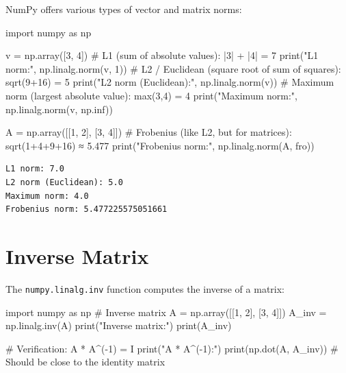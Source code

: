 \documentclass[
  english,
  letterpaper,
  DIV=11,
  numbers=noendperiod]{scrreprt}
\newenvironment{Shaded}{\begin{snugshade}}{\end{snugshade}}
\newcommand{\BuiltInTok}[1]{\textcolor[rgb]{0.00,0.23,0.31}{#1}}
\newcommand{\CommentTok}[1]{\textcolor[rgb]{0.37,0.37,0.37}{#1}}
\newcommand{\DecValTok}[1]{\textcolor[rgb]{0.68,0.00,0.00}{#1}}
\newcommand{\ImportTok}[1]{\textcolor[rgb]{0.00,0.46,0.62}{#1}}
\newcommand{\NormalTok}[1]{\textcolor[rgb]{0.00,0.23,0.31}{#1}}
\newcommand{\OperatorTok}[1]{\textcolor[rgb]{0.37,0.37,0.37}{#1}}
\newcommand{\StringTok}[1]{\textcolor[rgb]{0.13,0.47,0.30}{#1}}
\begin{document}
NumPy offers various types of vector and matrix norms:

\begin{Shaded}
\begin{Highlighting}[]
\ImportTok{import}\NormalTok{ numpy }\ImportTok{as}\NormalTok{ np}

\NormalTok{v }\OperatorTok{=}\NormalTok{ np.array([}\DecValTok{3}\NormalTok{, }\DecValTok{4}\NormalTok{])}
\CommentTok{\# L1 (sum of absolute values): |3| + |4| = 7}
\BuiltInTok{print}\NormalTok{(}\StringTok{"L1 norm:"}\NormalTok{, np.linalg.norm(v, }\DecValTok{1}\NormalTok{))}
\CommentTok{\# L2 / Euclidean (square root of sum of squares): sqrt(9+16) = 5}
\BuiltInTok{print}\NormalTok{(}\StringTok{"L2 norm (Euclidean):"}\NormalTok{, np.linalg.norm(v))}
\CommentTok{\# Maximum norm (largest absolute value): max(3,4) = 4}
\BuiltInTok{print}\NormalTok{(}\StringTok{"Maximum norm:"}\NormalTok{, np.linalg.norm(v, np.inf))}

\NormalTok{A }\OperatorTok{=}\NormalTok{ np.array([[}\DecValTok{1}\NormalTok{, }\DecValTok{2}\NormalTok{], [}\DecValTok{3}\NormalTok{, }\DecValTok{4}\NormalTok{]])}
\CommentTok{\# Frobenius (like L2, but for matrices): sqrt(1+4+9+16) ≈ 5.477}
\BuiltInTok{print}\NormalTok{(}\StringTok{"Frobenius norm:"}\NormalTok{, np.linalg.norm(A, }\StringTok{\textquotesingle{}fro\textquotesingle{}}\NormalTok{))}
\end{Highlighting}
\end{Shaded}

\begin{verbatim}
L1 norm: 7.0
L2 norm (Euclidean): 5.0
Maximum norm: 4.0
Frobenius norm: 5.477225575051661
\end{verbatim}

\section{Inverse Matrix}\label{inverse-matrix}

The \texttt{numpy.linalg.inv} function computes the inverse of a matrix:

\begin{Shaded}
\begin{Highlighting}[]
\ImportTok{import}\NormalTok{ numpy }\ImportTok{as}\NormalTok{ np}
\CommentTok{\# Inverse matrix}
\NormalTok{A }\OperatorTok{=}\NormalTok{ np.array([[}\DecValTok{1}\NormalTok{, }\DecValTok{2}\NormalTok{], [}\DecValTok{3}\NormalTok{, }\DecValTok{4}\NormalTok{]])}
\NormalTok{A\_inv }\OperatorTok{=}\NormalTok{ np.linalg.inv(A)}
\BuiltInTok{print}\NormalTok{(}\StringTok{"Inverse matrix:"}\NormalTok{)}
\BuiltInTok{print}\NormalTok{(A\_inv)}

\CommentTok{\# Verification: A * A\^{}({-}1) = I}
\BuiltInTok{print}\NormalTok{(}\StringTok{"A * A\^{}({-}1):"}\NormalTok{)}
\BuiltInTok{print}\NormalTok{(np.dot(A, A\_inv))  }\CommentTok{\# Should be close to the identity matrix}
\end{Highlighting}
\end{Shaded}
\end{document}
